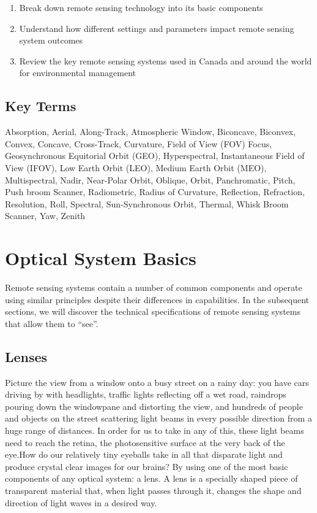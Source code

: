 \documentclass[
]{book}
\providecommand{\tightlist}{%
  \setlength{\itemsep}{0pt}\setlength{\parskip}{0pt}}
\begin{document}
\begin{enumerate}
\def\labelenumi{\arabic{enumi}.}
\tightlist
\item
  Break down remote sensing technology into its basic components
\item
  Understand how different settings and parameters impact remote sensing system outcomes
\item
  Review the key remote sensing systems used in Canada and around the world for environmental management
\end{enumerate}

\subsection*{Key Terms}\label{key-terms-9}

Absorption, Aerial, Along-Track, Atmospheric Window, Biconcave, Biconvex, Convex, Concave, Cross-Track, Curvature, Field of View (FOV) Focus, Geosynchronous Equitorial Orbit (GEO), Hyperspectral, Instantaneous Field of View (IFOV), Low Earth Orbit (LEO), Medium Earth Orbit (MEO), Multispectral, Nadir, Near-Polar Orbit, Oblique, Orbit, Panchromatic, Pitch, Push broom Scanner, Radiometric, Radius of Curvature, Reflection, Refraction, Resolution, Roll, Spectral, Sun-Synchronous Orbit, Thermal, Whisk Broom Scanner, Yaw, Zenith

\section{Optical System Basics}\label{optical-system-basics}

Remote sensing systems contain a number of common components and operate using similar principles despite their differences in capabilities. In the subsequent sections, we will discover the technical specifications of remote sensing systems that allow them to ``see''.

\subsection{Lenses}\label{lenses}

Picture the view from a window onto a busy street on a rainy day: you have cars driving by with headlights, traffic lights reflecting off a wet road, raindrops pouring down the windowpane and distorting the view, and hundreds of people and objects on the street scattering light beams in every possible direction from a huge range of distances. In order for us to take in any of this, these light beams need to reach the retina, the photosensitive surface at the very back of the eye.How do our relatively tiny eyeballs take in all that disparate light and produce crystal clear images for our brains? By using one of the most basic components of any optical system: a lens. A lens is a specially shaped piece of transparent material that, when light passes through it, changes the shape and direction of light waves in a desired way.
\end{document}
